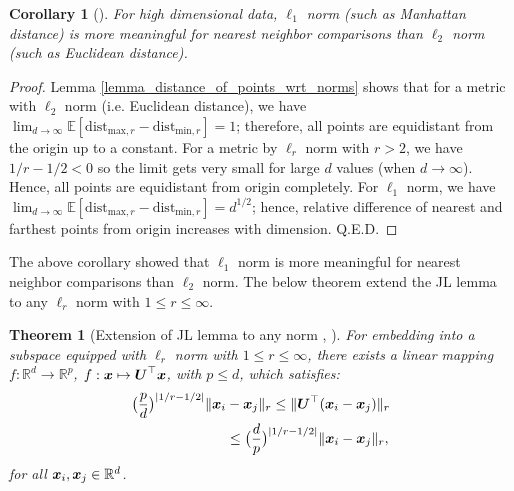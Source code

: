 \documentclass{article}
\newtheorem{theorem}{Theorem}
\newtheorem{corollary}{Corollary}
\def\b{\ensuremath\boldsymbol}
\begin{document}
\begin{corollary}[\cite{hinneburg2000nearest}]\label{corollary_l1_meaningful_than_l2}
For high dimensional data, $\ell_1$ norm (such as Manhattan distance) is more meaningful for nearest neighbor comparisons than $\ell_2$ norm (such as Euclidean distance). 
\end{corollary}
\begin{proof}
Lemma \ref{lemma_distance_of_points_wrt_norms} shows that for a metric with $\ell_2$ norm (i.e. Euclidean distance), we have $\lim_{d \rightarrow \infty} \mathbb{E}[\text{dist}_{\text{max},r} - \text{dist}_{\text{min},r}] = 1$; therefore, all points are equidistant from the origin up to a constant. For a metric by $\ell_r$ norm with $r > 2$, we have $1/r - 1/2 < 0$ so the limit gets very small for large $d$ values (when $d \rightarrow \infty$). Hence, all points are equidistant from origin completely. 
For $\ell_1$ norm, we have $\lim_{d \rightarrow \infty} \mathbb{E}[\text{dist}_{\text{max},r} - \text{dist}_{\text{min},r}] = d^{1/2}$; hence, relative difference of nearest and farthest points from origin increases with dimension. Q.E.D.
\end{proof}

The above corollary showed that $\ell_1$ norm is more meaningful for nearest neighbor comparisons than $\ell_2$ norm. The below theorem extend the JL lemma to any $\ell_r$ norm with $1 \leq r \leq \infty$. 
\begin{theorem}[Extension of JL lemma to any norm {\citep[Lemma 3.1]{lee2005metric}}, \cite{ward2014dimension}]\label{theorem_linear_mapping_lr_norm}
For embedding into a subspace equipped with $\ell_r$ norm with $1 \leq r \leq \infty$, there exists a linear mapping $f: \mathbb{R}^d \rightarrow \mathbb{R}^p$, $f: \b{x} \mapsto \b{U}^\top \b{x}$, with $p \leq d$, which satisfies:
\begin{align}
\big(\frac{p}{d}\big)^{|1/r - 1/2|} \|\b{x}_i &- \b{x}_j\|_r \leq \|\b{U}^\top (\b{x}_i - \b{x}_j)\|_r \nonumber\\
&\leq \big(\frac{d}{p}\big)^{|1/r - 1/2|} \|\b{x}_i - \b{x}_j\|_r,
\end{align}
for all $\b{x}_i, \b{x}_j \in \mathbb{R}^d$.
\end{theorem}
\end{document}
